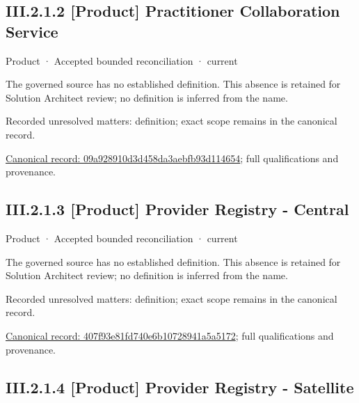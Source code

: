 \subsection*{III.2.1.2 [Product] Practitioner Collaboration Service}
\label{navigation:III.2.1.2}

\label{element:09a928910d3d458da3aebfb93d114654}
{\small Product · Accepted bounded reconciliation · current}\par

The governed source has no established definition. This absence is retained for Solution Architect review; no definition is inferred from the name.


{\small Recorded unresolved matters: definition; exact scope remains in the canonical record.}\par
{\footnotesize \href{../../../../../../../continuum/business/product/09a928910d3d458da3aebfb93d114654.md}{Canonical record: 09a928910d3d458da3aebfb93d114654}; full qualifications and provenance.}\par
\subsection*{III.2.1.3 [Product] Provider Registry - Central}
\label{navigation:III.2.1.3}

\label{element:407f93e81fd740e6b10728941a5a5172}
{\small Product · Accepted bounded reconciliation · current}\par

The governed source has no established definition. This absence is retained for Solution Architect review; no definition is inferred from the name.


{\small Recorded unresolved matters: definition; exact scope remains in the canonical record.}\par
{\footnotesize \href{../../../../../../../continuum/business/product/407f93e81fd740e6b10728941a5a5172.md}{Canonical record: 407f93e81fd740e6b10728941a5a5172}; full qualifications and provenance.}\par
\subsection*{III.2.1.4 [Product] Provider Registry - Satellite}
\label{navigation:III.2.1.4}

